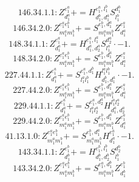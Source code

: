 \documentclass[letterpaper,10pt,fleqn,leqno,onecolumn]{article}
\begin{document}
\begin{equation} \;\;\;\;\;\;  146.34.1.1: Z^{e_{1}^{a}}_{d_{1}^{a}}+=H^{e_{1}^{a},l_{1}^{b}}_{d_{1}^{b},d_{1}^{a}}S^{d_{1}^{b}}_{l_{1}^{b}} \end{equation}
\begin{equation} \;\;\;\;\;\;  146.34.2.0: Z^{e_{1}^{a}e_{1}^{b}}_{m_{1}^{a}m_{1}^{b}}+=S^{e_{1}^{b},d_{1}^{a}}_{m_{1}^{a}m_{1}^{b}}Z^{e_{1}^{a}}_{d_{1}^{a}} \end{equation}
\begin{equation} \;\;\;\;\;\;  148.34.1.1: Z^{e_{1}^{a}}_{d_{1}^{a}}+=H^{e_{1}^{a},l_{1}^{a}}_{d_{1}^{a},d_{2}^{a}}S^{d_{2}^{a}}_{l_{1}^{a}}\cdot -1. \end{equation}
\begin{equation} \;\;\;\;\;\;  148.34.2.0: Z^{e_{1}^{a}e_{1}^{b}}_{m_{1}^{a}m_{1}^{b}}+=S^{e_{1}^{b},d_{1}^{a}}_{m_{1}^{a}m_{1}^{b}}Z^{e_{1}^{a}}_{d_{1}^{a}} \end{equation}
\begin{equation} \;\;\;\;\;\;  227.44.1.1: Z^{e_{1}^{a}}_{d_{1}^{a}}+=S^{e_{1}^{a},d_{1}^{b}}_{l_{1}^{a}l_{1}^{b}}H^{l_{1}^{a}l_{1}^{b}}_{d_{1}^{b},d_{1}^{a}}\cdot -1. \end{equation}
\begin{equation} \;\;\;\;\;\;  227.44.2.0: Z^{e_{1}^{a}e_{1}^{b}}_{m_{1}^{a}m_{1}^{b}}+=S^{e_{1}^{b},d_{1}^{a}}_{m_{1}^{a}m_{1}^{b}}Z^{e_{1}^{a}}_{d_{1}^{a}} \end{equation}
\begin{equation} \;\;\;\;\;\;  229.44.1.1: Z^{e_{1}^{a}}_{d_{1}^{a}}+=S^{e_{1}^{a},d_{2}^{a}}_{l_{1}^{a}l_{2}^{a}}H^{l_{1}^{a}l_{2}^{a}}_{d_{1}^{a},d_{2}^{a}} \end{equation}
\begin{equation} \;\;\;\;\;\;  229.44.2.0: Z^{e_{1}^{a}e_{1}^{b}}_{m_{1}^{a}m_{1}^{b}}+=S^{e_{1}^{b},d_{1}^{a}}_{m_{1}^{a}m_{1}^{b}}Z^{e_{1}^{a}}_{d_{1}^{a}} \end{equation}
\begin{equation} \;\;\;\;\;\;  41.13.1.0: Z^{e_{1}^{a}e_{1}^{b}}_{m_{1}^{a}m_{1}^{b}}+=S^{e_{1}^{b},d_{1}^{a}}_{m_{1}^{a}m_{1}^{b}}H^{e_{1}^{a}}_{d_{1}^{a}}\cdot -1. \end{equation}
\begin{equation} \;\;\;\;\;\;  143.34.1.1: Z^{e_{1}^{b}}_{d_{1}^{b}}+=H^{e_{1}^{b},l_{1}^{b}}_{d_{1}^{b},d_{2}^{b}}S^{d_{2}^{b}}_{l_{1}^{b}} \end{equation}
\begin{equation} \;\;\;\;\;\;  143.34.2.0: Z^{e_{1}^{a}e_{1}^{b}}_{m_{1}^{a}m_{1}^{b}}+=S^{e_{1}^{a},d_{1}^{b}}_{m_{1}^{a}m_{1}^{b}}Z^{e_{1}^{b}}_{d_{1}^{b}} \end{equation}
\end{document}
